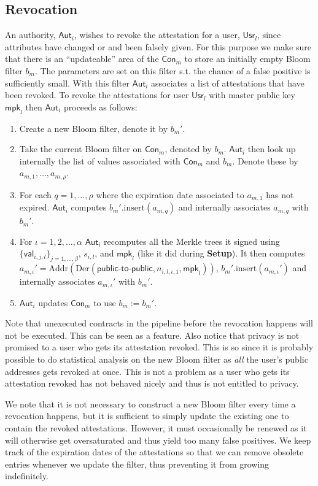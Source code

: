\documentclass[11pt]{article} %
\newcommand{\aut}{\ensuremath{\mathsf{Aut}_i}}
\newcommand{\val}{\ensuremath{\mathsf{val}_{i,j,l}}}
\newcommand{\usr}{\ensuremath{\mathsf{Usr}_l}}
\newcommand{\con}{\ensuremath{\mathsf{Con}_m}}
\newcommand{\mpk}{\ensuremath{\mathsf{mpk}}}
\newcommand{\Der}{\ensuremath{\mathrm{Der}}}
\newcommand{\Addr}{\ensuremath{\mathrm{Addr}}}
\renewcommand{\insert}{\ensuremath{\mathrm{insert}}}
\begin{document}
\subsection{Revocation}
An authority, $\aut$, wishes to revoke the attestation for a user, $\usr$, since attributes have changed or and been falsely given. For this purpose we make sure that there is an ``updateable'' area of the $\con$ to store an initially empty Bloom filter $b_m$. The parameters are set on this filter s.t. the chance of a false positive is sufficiently small. With this filter $\aut$ associates a list of attestations that have been revoked. To revoke the attestations for user $\usr$ with master public key $\mpk_l$ then $\aut$ proceeds as follows:
\begin{enumerate}
	\item Create a new Bloom filter, denote it by $b_m'$.
	\item Take the current Bloom filter on $\con$, denoted by $b_m$. $\aut$ then look up internally the list of values associated with $\con$ and $b_m$. Denote these by $a_{m, 1}, \dots, a_{m, \rho}$.
	\item For each $q=1, \dots, \rho$ where the expiration date associated to $a_{m,1}$ has not expired. $\aut$ computes $b_m'.\insert(a_{m, q})$ and internally associates $a_{m,q}$ with $b_m'$.
	\item \sloppy For $\iota=1, 2, \dots, \alpha$ $\aut$ recomputes all the Merkle trees it signed using $\{\val\}_{j=1, \dots, \beta}$, $s_{i, l}$, and $\mpk_l$ (like it did during \textbf{Setup}). It then computes $a_{m, \iota}' = \Addr\left(\Der\left(\mathsf{public}\mbox{-}\mathsf{to}\mbox{-}\mathsf{public}, n_{i,l,\iota, 1}, \mpk_l\right)\right)$, $b_m'.\insert(a_{m, \iota}')$ and internally associates $a_{m,\iota}'$ with $b_m'$.
	\item $\aut$ updates $\con$ to use $b_m:=b_m'$.
\end{enumerate}
Note that unexecuted contracts in the pipeline before the revocation happens will not be executed. This can be seen as a feature. Also notice that privacy is not promised to a user who gets its attestation revoked. This is so since it is probably possible to do statistical analysis on the new Bloom filter as \emph{all} the user's public addresses gets revoked at once. This is not a problem as a user who gets its attestation revoked has not behaved nicely and thus is not entitled to privacy.

We note that it is not necessary to construct a new Bloom filter every time a revocation happens, but it is sufficient to simply update the existing one to contain the revoked attestations. However, it must occasionally be renewed as it will otherwise get oversaturated and thus yield too many false positives. We keep track of the expiration dates of the attestations so that we can remove obsolete entries whenever we update the filter, thus preventing it from growing indefinitely.
\end{document}
